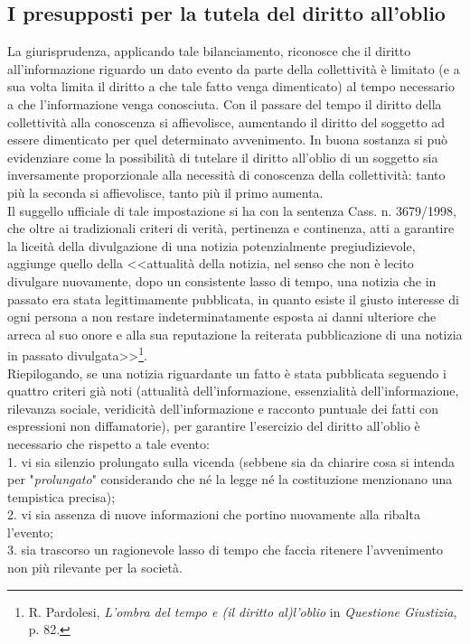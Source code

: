 \subsection{I presupposti per la tutela del diritto all'oblio}
La giurisprudenza, applicando tale bilanciamento, riconosce che il diritto all'informazione riguardo un dato evento da parte della collettività è limitato (e a sua volta limita il diritto a che tale fatto venga dimenticato) al tempo necessario a che l'informazione venga conosciuta. Con il passare del tempo il diritto della collettività alla conoscenza si affievolisce, aumentando il diritto del soggetto ad essere dimenticato per quel determinato avvenimento.
In buona sostanza si può evidenziare come la possibilità di tutelare il diritto all'oblio di un soggetto sia inversamente proporzionale alla necessità di conoscenza della collettività: tanto più la seconda si affievolisce, tanto più il primo aumenta.
\\Il suggello ufficiale di tale impostazione si ha con la sentenza Cass. n. 3679/1998, che oltre ai tradizionali criteri di verità, pertinenza e continenza, atti a garantire la liceità della divulgazione di una notizia potenzialmente pregiudizievole, aggiunge quello della <<attualità della notizia, nel senso che non è lecito divulgare nuovamente, dopo un consistente lasso di tempo, una notizia che in passato era stata legittimamente pubblicata, in quanto esiste il giusto interesse di ogni persona a non restare indeterminatamente esposta ai danni ulteriore che arreca al suo onore e alla sua reputazione la reiterata pubblicazione di una notizia in passato divulgata>>\footnote{R. Pardolesi, \textit{L'ombra del tempo e (il diritto al)l'oblio} in \textit{Questione Giustizia}, p. 82.}.
\\Riepilogando, se una notizia riguardante un fatto è stata pubblicata seguendo i quattro criteri già noti (attualità dell'informazione, essenzialità dell'informazione, rilevanza sociale, veridicità dell'informazione e racconto puntuale dei fatti con espressioni non diffamatorie), per garantire l'esercizio del diritto all'oblio è necessario che rispetto a tale evento:
\\1. vi sia silenzio prolungato sulla vicenda (sebbene sia da chiarire cosa si intenda per "\textit{prolungato}" considerando che né la legge né la costituzione menzionano una tempistica precisa);
\\2. vi sia assenza di nuove informazioni che portino nuovamente alla ribalta l'evento;
\\3. sia trascorso un ragionevole lasso di tempo che faccia ritenere l'avvenimento non più rilevante per la società.

